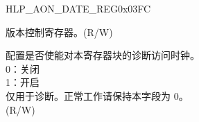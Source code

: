 \begin{register}{H}{LP\_AON\_DATE\_REG}{0x03FC}\label{regdesc:LPAONDATEREG}
%
%
\regnewline%
\begin{regdesc}\begin{reglist}
\label{fielddesc:LPAONDATE}\item [LP\_AON\_DATE] 版本控制寄存器。(R/W)
\label{fielddesc:LPAONCLKEN}\item [LP\_AON\_CLK\_EN] 配置是否使能对本寄存器块的诊断访问时钟。\\
0：关闭\\
1：开启\\
仅用于诊断。正常工作请保持本字段为 0。\\
(R/W)
\end{reglist}\end{regdesc}
\end{register}

